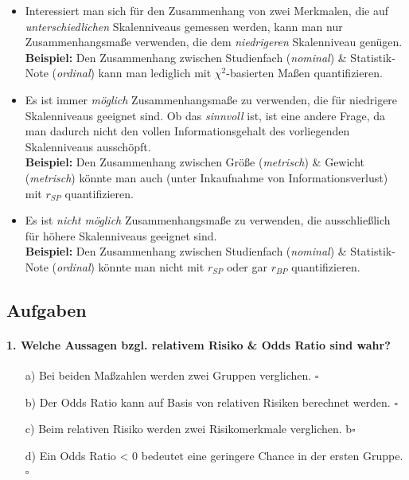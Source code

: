 \documentclass[a4paper]{article}
\begin{document}
\begin{itemize}
    \item Interessiert man sich für den Zusammenhang von zwei Merkmalen, die auf \textit{unterschiedlichen} Skalenniveaus gemessen werden, kann man nur Zusammenhangsmaße verwenden, die dem \textit{niedrigeren} Skalenniveau genügen.\\
    \textbf{Beispiel:} Den Zusammenhang zwischen Studienfach (\textit{nominal}) \& Statistik-Note (\textit{ordinal}) kann man lediglich mit $\chi^2$-basierten Maßen quantifizieren.
    \item Es ist immer \textit{möglich} Zusammenhangsmaße zu verwenden, die für niedrigere Skalenniveaus geeignet sind. Ob das \textit{sinnvoll} ist, ist eine andere Frage, da man dadurch nicht den vollen Informationsgehalt des vorliegenden Skalenniveaus ausschöpft.\\
    \textbf{Beispiel:} Den Zusammenhang zwischen Größe (\textit{metrisch}) \& Gewicht (\textit{metrisch}) könnte man auch (unter Inkaufnahme von Informationsverlust) mit $r_{SP}$ quantifizieren.
    \item Es ist \textit{nicht möglich} Zusammenhangsmaße zu verwenden, die ausschließlich für höhere Skalenniveaus geeignet sind.\\
    \textbf{Beispiel:} Den Zusammenhang zwischen Studienfach (\textit{nominal}) \& Statistik-Note (\textit{ordinal}) könnte man nicht mit $r_{SP}$ oder gar $r_{BP}$ quantifizieren.
\end{itemize}

\clearpage

\subsection{Aufgaben}

\paragraph{1. Welche Aussagen bzgl. relativem Risiko \& Odds Ratio sind wahr?}

\begin{itemize}
    \item[a)] Bei beiden Maßzahlen werden zwei Gruppen verglichen. \hfill $\square$
    \item[b)] Der Odds Ratio kann auf Basis von relativen Risiken berechnet werden. \hfill $\square$
    \item[c)] Beim relativen Risiko werden zwei Risikomerkmale verglichen. b\hfill $\square$
    \item[d)] Ein Odds Ratio < 0 bedeutet eine geringere Chance in der ersten Gruppe. \hfill $\square$
\end{itemize}
\end{document}
